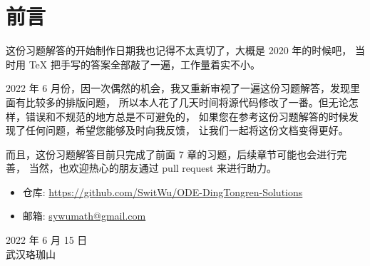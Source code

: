 \chapter*{前言}



这份习题解答的开始制作日期我也记得不太真切了，大概是 2020 年的时候吧，
当时用 \TeX{} 把手写的答案全部敲了一遍，工作量着实不小。

2022 年 6 月份，因一次偶然的机会，我又重新审视了一遍这份习题解答，发现里面有比较多的排版问题，
所以本人花了几天时间将源代码修改了一番。但无论怎样，错误和不规范的地方总是不可避免的，
如果您在参考这份习题解答的时候发现了任何问题，希望您能够及时向我反馈，
让我们一起将这份文档变得更好。

而且，这份习题解答目前只完成了前面 7 章的习题，后续章节可能也会进行完善，
当然，也欢迎热心的朋友通过 pull request 来进行助力。

\begin{itemize}
  \item 仓库: \url{https://github.com/SwitWu/ODE-DingTongren-Solutions}
  \item 邮箱: \href{mailto:sywumath@gmail.com}{\ttfamily sywumath@gmail.com}
\end{itemize}

\begin{flushright}
  2022 年 6 月 15 日 \\
  武汉珞珈山
\end{flushright}